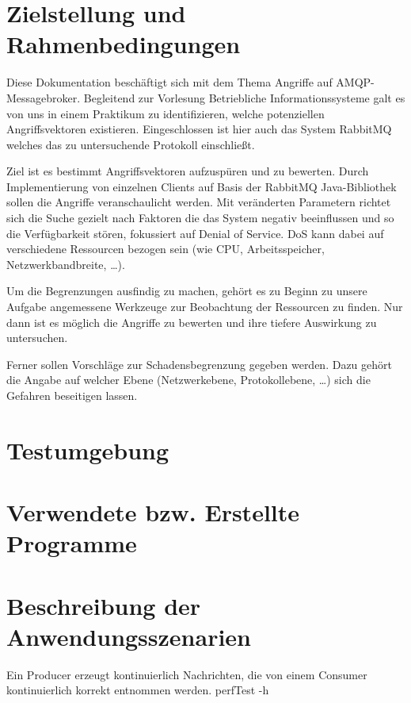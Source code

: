 \documentclass[	a4paper,
			11pt,
			titlepage,
			oneside,
			fleqn,
			listof=totoc,
			parskip,
			chapterprefix=false,
			numbers=noenddot]{scrreprt}
\begin{document}
	
	
	\section*{Zielstellung und Rahmenbedingungen}
	
	Diese Dokumentation beschäftigt sich mit dem Thema \glqq Angriffe auf AMQP-Messagebroker\grqq . Begleitend zur Vorlesung  \glqq Betriebliche Informationssysteme\grqq\/ galt es von uns in einem Praktikum zu identifizieren, welche potenziellen Angriffsvektoren existieren. Eingeschlossen ist hier auch das System \glqq RabbitMQ\grqq\/ welches das zu untersuchende Protokoll einschließt.

Ziel ist es bestimmt Angriffsvektoren aufzuspüren und zu bewerten. Durch Implementierung von einzelnen Clients auf Basis der RabbitMQ Java-Bibliothek sollen die Angriffe veranschaulicht werden.  Mit veränderten Parametern richtet sich die Suche gezielt nach Faktoren die das System negativ beeinflussen und so die Verfügbarkeit stören, fokussiert auf \glqq Denial of Service\grqq. DoS kann dabei auf verschiedene Ressourcen bezogen sein (wie CPU, Arbeitsspeicher, Netzwerkbandbreite, …).

Um die Begrenzungen ausfindig zu machen, gehört es zu Beginn zu unsere Aufgabe angemessene Werkzeuge zur Beobachtung der Ressourcen zu finden. Nur dann ist es möglich die Angriffe zu bewerten und ihre tiefere Auswirkung zu untersuchen.

Ferner sollen Vorschläge zur Schadensbegrenzung gegeben werden. Dazu gehört die Angabe auf welcher Ebene (Netzwerkebene, Protokollebene, …) sich die Gefahren beseitigen lassen.

	\clearpage
	\section*{Testumgebung}
	
	
	\clearpage
	\section*{Verwendete bzw. Erstellte Programme}
	
	\clearpage
	\section*{Beschreibung der Anwendungsszenarien}
		{Ein Producer erzeugt kontinuierlich Nachrichten, die von einem Consumer kontinuierlich korrekt entnommen werden.}%
		{perfTest -h}%
		{}
		
\end{document}
